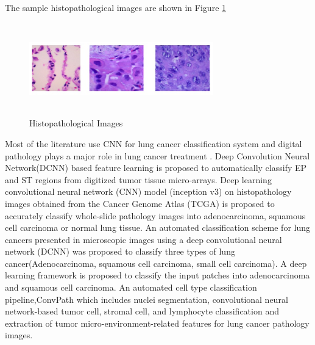\documentclass[conference]{IEEEtran}
\begin{document}
The sample histopathological images are shown in Figure \ref{histo_img}
\begin{figure}[htbp]
\centerline{\includegraphics[width=8cm, height=4cm]{./figures/histo_img.png}}
\caption{Histopathological Images}
\label{histo_img}
\end{figure}
 Most of the literature use CNN for lung cancer classification system and digital pathology plays a  major role in lung cancer treatment \cite{wang2019artificial}. Deep Convolution Neural Network(DCNN) based feature learning is proposed \cite{xu2016deep} to automatically classify EP and ST regions from digitized tumor tissue micro-arrays. Deep learning convolutional neural network (CNN) model (inception v3) on histopathology images obtained from the Cancer Genome Atlas (TCGA) is proposed \cite{coudray2018classification} to accurately classify whole-slide pathology images into adenocarcinoma, squamous cell carcinoma or normal lung tissue. An automated classification scheme for lung cancers presented in microscopic images using a deep convolutional neural network (DCNN) was proposed \cite{teramoto2017automated} to classify three types of lung cancer(Adenocarcinoma, squamous cell carcinoma, small cell carcinoma). A deep learning framework is proposed \cite{grahamaclassification} to classify the input patches into adenocarcinoma and squamous cell carcinoma. An automated cell type classification pipeline,ConvPath \cite{wang2019convpath} which includes nuclei segmentation, convolutional neural network-based tumor cell, stromal cell, and lymphocyte classification and extraction of tumor micro-environment-related features for lung cancer pathology images.
 
 
\end{document}
